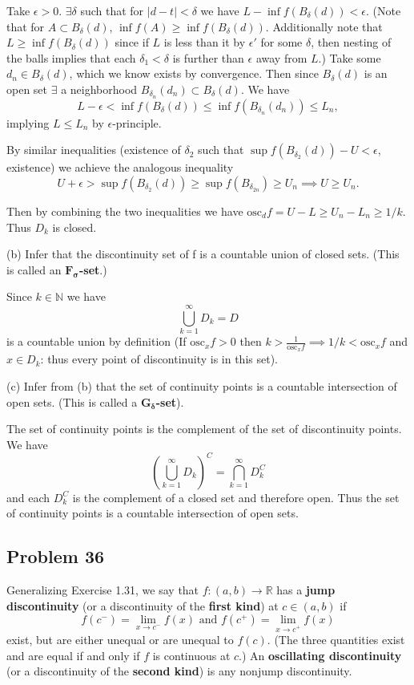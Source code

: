 \documentclass{amsart}
\begin{document}
\medskip \noindent Take $\epsilon>0$. $\exists\delta$ such that for $|d-t|<\delta$ we have $L-\inf f(B_{\delta}(d))<\epsilon$. (Note
that for $A\subset B_{\delta}(d)$, $\inf f(A)\geq \inf f(B_{\delta}(d))$. Additionally note that $L\geq\inf f(B_{\delta}
(d))$ since if $L$ is less than it by $\epsilon'$ for some $\delta$, then nesting of the balls implies that each $\delta_1<\delta$ is further
than $\epsilon$ away from $L$.) Take some $d_n\in B_{\delta}(d)$, which 
we know exists by convergence. Then since $B_{\delta}(d)$ is an open set $\exists$ a neighborhood $B_{\delta_n}(d_n)\subset B_{\delta}(d)$.
We have \[L-\epsilon< \inf f(B_{\delta}(d))\leq\inf f(B_{\delta_n}(d_n))\leq L_n,\] implying $L\leq L_n$ by $\epsilon$-principle.

\medskip \noindent By similar inequalities (existence of $\delta_2$ such that $\sup f(B_{\delta_2}(d))-U<\epsilon$, existence)
we achieve the analogous inequality \[U+\epsilon>\sup f(B_{\delta_2}(d))\geq\sup f(B_{\delta_{2n}})\geq U_n\implies U\geq U_n.\]

\medskip \noindent Then by combining the two inequalities we have $\text{osc}_df = U-L\geq U_n-L_n\geq 1/k$. Thus $D_k$ is closed.

\bigskip

(b) Infer that the discontinuity set of f is a countable union of closed sets.
(This is called an \textbf{$\mathbf{F}_{\boldsymbol{\sigma}}$-set}.)

\medskip \noindent Since $k\in\mathbb{N}$ we have \[\bigcup_{k=1}^{\infty}D_k = D\] is a countable union by definition (If $\text{osc}_xf>0$ then
$k>\frac{1}{\text{osc}_xf}\implies 1/k<\text{osc}_xf$ and $x\in D_k$: thus every point of discontinuity is in this set).

\bigskip

(c) Infer from (b) that the set of continuity points is a countable intersection
of open sets. (This is called a \textbf{$\mathbf{G}_{\boldsymbol{\delta}}$-set}).

\medskip \noindent The set of continuity points is the complement of the set of discontinuity points. We have
\[(\bigcup_{k=1}^{\infty}D_k)^C = \bigcap_{k=1}^{\infty}D_k^C\] and each $D_k^C$ is the complement of a closed 
set and therefore open. Thus the set of continuity points is a countable intersection of open sets.	

\newpage

\subsection*{Problem 36} Generalizing Exercise 1.31, we say that $f: (a,b)\rightarrow \mathbb{R}$
has a \textbf{jump discontinuity} (or a discontinuity of the \textbf{first kind}) at $c\in(a,b)$
if \[f(c^{-}) = \lim_{x\rightarrow c^-}f(x) \text{ and } f(c^+)=\lim_{x\rightarrow c^+}f(x)\] exist, but
are either unequal or are unequal to $f(c)$. (The three quantities exist and are equal if and only if $f$ is continuous at $c$.) An \textbf{oscillating discontinuity} (or a discontinuity of 
the \textbf{second kind}) is any nonjump discontinuity. 
\end{document}
